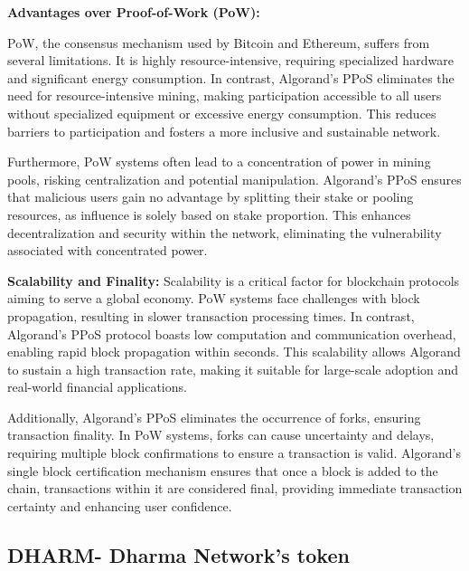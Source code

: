 \textbf{Advantages over Proof-of-Work (PoW):}\newline

PoW, the consensus mechanism used by Bitcoin and Ethereum, suffers from several limitations. It is highly resource-intensive, requiring specialized hardware and significant energy consumption. In contrast, Algorand's PPoS eliminates the need for resource-intensive mining, making participation accessible to all users without specialized equipment or excessive energy consumption. This reduces barriers to participation and fosters a more inclusive and sustainable network.\newline

Furthermore, PoW systems often lead to a concentration of power in mining pools, risking centralization and potential manipulation. Algorand's PPoS ensures that malicious users gain no advantage by splitting their stake or pooling resources, as influence is solely based on stake proportion. This enhances decentralization and security within the network, eliminating the vulnerability associated with concentrated power.\newline


\textbf{Scalability and Finality:}\newline
Scalability is a critical factor for blockchain protocols aiming to serve a global economy. PoW systems face challenges with block propagation, resulting in slower transaction processing times. In contrast, Algorand's PPoS protocol boasts low computation and communication overhead, enabling rapid block propagation within seconds. This scalability allows Algorand to sustain a high transaction rate, making it suitable for large-scale adoption and real-world financial applications.\newline

Additionally, Algorand's PPoS eliminates the occurrence of forks, ensuring transaction finality. In PoW systems, forks can cause uncertainty and delays, requiring multiple block confirmations to ensure a transaction is valid. Algorand's single block certification mechanism ensures that once a block is added to the chain, transactions within it are considered final, providing immediate transaction certainty and enhancing user confidence.\newline

\subsection{DHARM- Dharma Network's token}

